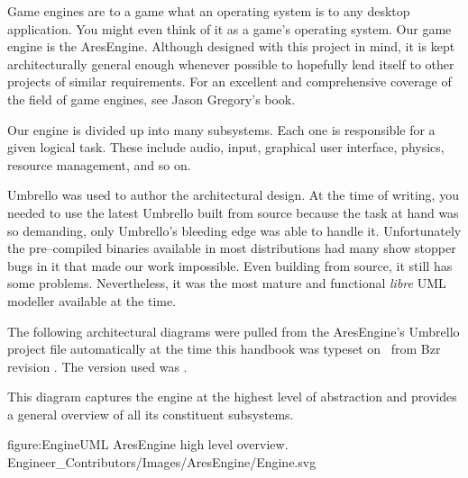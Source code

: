 

Game engines are to a game what an operating system is to any desktop application. You might even think of it as a game's operating system. Our game engine is the AresEngine. Although designed with this project in mind, it is kept architecturally general enough whenever possible to hopefully lend itself to other projects of similar requirements. For an excellent and comprehensive coverage of the field of game engines, see Jason Gregory's book.
    {}

Our engine is divided up into many subsystems. Each one is responsible for a given logical task. These include audio, input, graphical user interface, physics, resource management, and so on.

Umbrello was used to author the architectural design. At the time of writing, you needed to use the latest Umbrello built from source because the task at hand was so demanding, only Umbrello's bleeding edge was able to handle it. Unfortunately the pre--compiled binaries available in most distributions had many show stopper bugs in it that made our work impossible. Even building from source, it still has some problems. Nevertheless, it was the most mature and functional {\it libre} UML modeller available at the time. 

The following architectural diagrams were pulled from the AresEngine's Umbrello project file automatically at the time this handbook was typeset on \currentdate\ from Bzr revision \BzrRevisionClickable. The version used was \UmbrelloVersion.

This diagram captures the engine at the highest level of abstraction and provides a general overview of all its constituent subsystems.

\FullPageDiagram
    {figure:EngineUML}
    {AresEngine high level overview.}
    {Engineer_Contributors/Images/AresEngine/Engine.svg}


